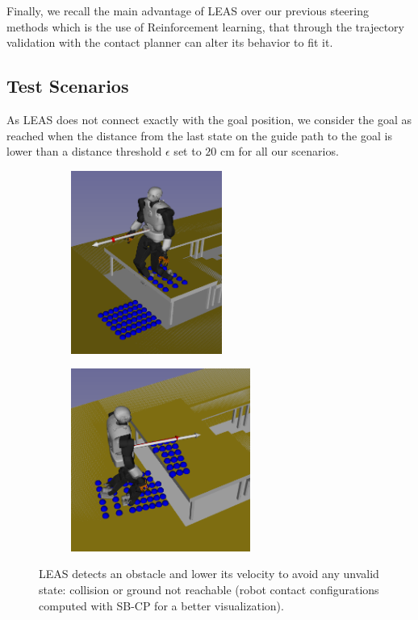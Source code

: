 Finally, we recall the main advantage of LEAS over our previous steering methods which is the use of Reinforcement learning, that through the trajectory validation with the contact planner can alter its behavior to fit it.

\subsection{Test Scenarios\label{subsub:leas:test_scenarios}}

As LEAS does not connect exactly with the goal position, we consider the goal as reached when the distance from the last state on the guide path to the goal is lower than a distance threshold $\epsilon$ set to $20$ cm for all our scenarios.


\begin{figure}
    \centering
    \captionsetup[subfigure]{justification=centering}
    \begin{subfigure}[t]{0.43\linewidth}
    \includegraphics[width=\textwidth,height=6cm]{Figures/Chapter_LEAS/stop_bauzil_0.png}
    \end{subfigure}
    \begin{subfigure}[t]{0.43\linewidth}
    \includegraphics[width=\textwidth,height=6cm]{Figures/Chapter_LEAS/stop_bauzil_1.png}
    \end{subfigure}
    \label{fig:leas_stop_void_obstacle}
    \caption{LEAS detects an obstacle and lower its velocity to avoid any unvalid state: collision or ground not reachable (robot contact configurations computed with SB-CP for a better visualization).}
\end{figure}

